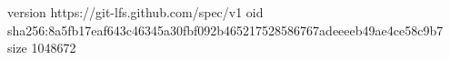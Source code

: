 version https://git-lfs.github.com/spec/v1
oid sha256:8a5fb17eaf643c46345a30fbf092b465217528586767adeeeeb49ae4ce58c9b7
size 1048672
